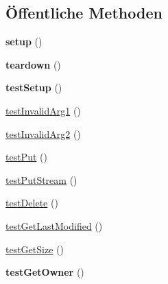 \subsection*{Öffentliche Methoden}
\begin{DoxyCompactItemize}
\item 
\mbox{\label{class_sabre_1_1_cal_d_a_v_1_1_calendar_object_test_ad9f7f88bcdead01a9adb97f11e855fd6}} 
{\bfseries setup} ()
\item 
\mbox{\label{class_sabre_1_1_cal_d_a_v_1_1_calendar_object_test_a7fb49c05bb913d8a71863d919b299efb}} 
{\bfseries teardown} ()
\item 
\mbox{\label{class_sabre_1_1_cal_d_a_v_1_1_calendar_object_test_a44649ecdeeed849b5009ee11324e234d}} 
{\bfseries test\+Setup} ()
\item 
\mbox{\hyperlink{class_sabre_1_1_cal_d_a_v_1_1_calendar_object_test_aeeda27588f2c90c7b00ace1520b942d2}{test\+Invalid\+Arg1}} ()
\item 
\mbox{\hyperlink{class_sabre_1_1_cal_d_a_v_1_1_calendar_object_test_a02100e6e53fcbce5d7f30675d0d01b12}{test\+Invalid\+Arg2}} ()
\item 
\mbox{\hyperlink{class_sabre_1_1_cal_d_a_v_1_1_calendar_object_test_ad94cec10fb678b457f029c859b3302da}{test\+Put}} ()
\item 
\mbox{\hyperlink{class_sabre_1_1_cal_d_a_v_1_1_calendar_object_test_a89aeaf8dbe0770f37a5be70cf2193105}{test\+Put\+Stream}} ()
\item 
\mbox{\hyperlink{class_sabre_1_1_cal_d_a_v_1_1_calendar_object_test_a05ebe4e56f1ef0bdac555ff36c6e3069}{test\+Delete}} ()
\item 
\mbox{\hyperlink{class_sabre_1_1_cal_d_a_v_1_1_calendar_object_test_a22e0cd95af969c0535ac32c65e494235}{test\+Get\+Last\+Modified}} ()
\item 
\mbox{\hyperlink{class_sabre_1_1_cal_d_a_v_1_1_calendar_object_test_add4eeb5d221f622b018f91a3e22063ae}{test\+Get\+Size}} ()
\item 
\mbox{\label{class_sabre_1_1_cal_d_a_v_1_1_calendar_object_test_af195ef06df87a26ca60d547db70f87c4}} 
{\bfseries test\+Get\+Owner} ()
\item 

\end{DoxyCompactItemize}
